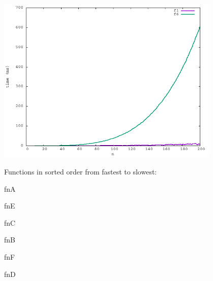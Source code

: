 \documentclass{article}
\begin{document}
    \begin{center}
        \includegraphics[width=0.8\textwidth]{f1f6}
    \end{center}


    Functions in sorted order from fastest to slowest:

    fnA

    fnE

    fnC

    fnB

    fnF

    fnD
    
\end{document}
